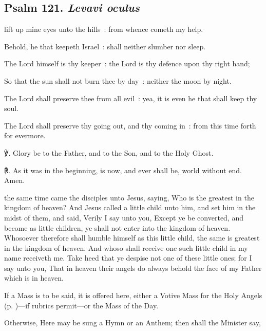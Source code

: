 \clearpage
\subsection{Psalm 121. \textit{Levavi oculus}}
 lift up mine eyes unto the hills~: from whence cometh my help.\par
{}
Behold, he that keepeth Israel~: shall neither slumber nor sleep.\par
{}The Lord himself is thy keeper~: the Lord is thy defence upon thy right hand;\par
{}So that the sun shall not burn thee by day~: neither the moon by night.\par
{}The Lord shall preserve thee from all evil~: yea, it is even he that shall keep thy soul.\par
{}The Lord shall preserve thy going out, and thy coming in~: from this time forth for evermore.\par
℣. Glory be to the Father, and to the Son, and to the Holy Ghost.\par
℟. As it was in the beginning, is now, and ever shall be, world without end. Amen.

  the same time came the disciples unto Jesus, saying, Who is the greatest in the kingdom of heaven? And Jesus called a little child unto him, and set him in the midst of them, and said, Verily I say unto you, Except ye be converted, and become as little children, ye shall not enter into the kingdom of heaven. Whosoever therefore shall humble himself as this little child, the same is greatest in the kingdom of heaven. And whoso shall receive one such little child in my name receiveth me. Take heed that ye despise not one of these little ones; for I say unto you, That in heaven their angels do always behold the face of my Father which is in heaven.

 \begin{rubric}
    If a Mass is to be said, it is offered here, either a Votive Mass for the Holy Angels (p. \pageref{MassOfTheAngels})---if rubrics permit---or the Mass of the Day.\par
    Otherwise, Here may be sung a Hymn or an Anthem; then shall the Minister say,
\end{rubric}

